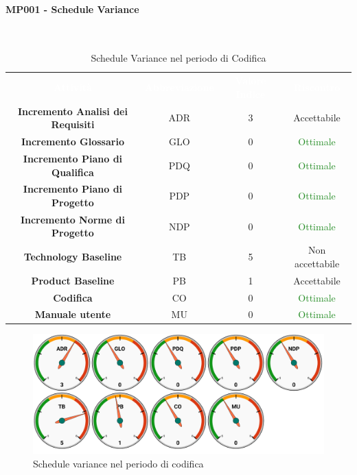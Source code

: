 \paragraph{MP001 - Schedule Variance}\mbox{}\\[0,3cm]

    \begin{table}[H]
        \centering
        \begin{tabular}{cccc}
            \rowcolor{greySWEight}
            \textcolor{white}{\textbf{Attività}} & 
            \textcolor{white}{\textbf{Abbreviazione}} &
            \textcolor{white}{\textbf{Valore Indice}}&
            \textcolor{white}{\textbf{Riscontro}}\\
            \textbf{Incremento Analisi dei Requisiti} & ADR & 3 & \textcolor{YellowOrange}{Accettabile}\\
            \textbf{Incremento Glossario} & GLO & 0 & \textcolor{ForestGreen}{Ottimale} \\
            \textbf{Incremento Piano di Qualifica} & PDQ & 0 & \textcolor{ForestGreen}{Ottimale} \\
            \textbf{Incremento Piano di Progetto} & PDP & 0 & \textcolor{ForestGreen}{Ottimale} \\
            \textbf{Incremento Norme di Progetto} & NDP & 0 & \textcolor{ForestGreen}{Ottimale} \\
            \textbf{Technology Baseline} & TB & 5 & \textcolor{RubineRed}{Non accettabile} \\
            \textbf{Product Baseline} & PB & 1 & \textcolor{YellowOrange}{Accettabile} \\
            \textbf{Codifica} & CO & 0 & \textcolor{ForestGreen}{Ottimale} \\
            \textbf{Manuale utente} & MU & 0 & \textcolor{ForestGreen}{Ottimale} \\

        \end{tabular}
        \caption{Schedule Variance nel periodo di Codifica}
    \end{table}
    \begin{figure}[H]
        \centering
        \includegraphics[width=0.7\linewidth]{sez/App_Esito/Qualifica/graph/SV_RQ.pdf}
        \caption{Schedule variance nel periodo di codifica}
    \end{figure}
